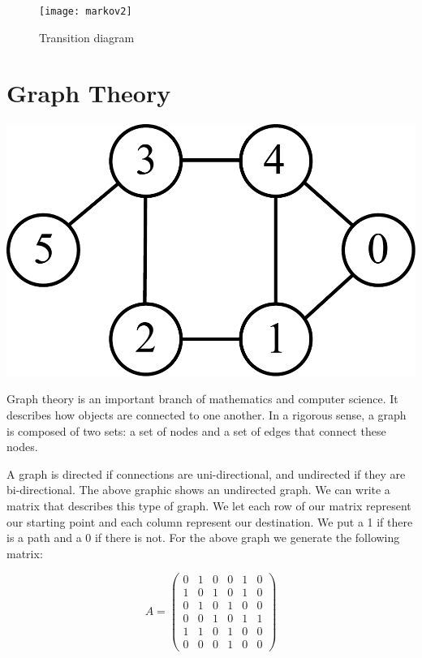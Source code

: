 \begin{figure}[h!]
\begin{center}
\texttt{[image: markov2]}
\end{center}
\caption{Transition diagram}
\label{markov2}
\end{figure}

\newpage

\section*{Graph Theory}
\begin{center}
\includegraphics[scale = .8]{graphExample}
\end{center}

Graph theory is an important branch of mathematics and computer science.
It describes how objects are connected to one another.
In a rigorous sense, a graph is composed of two sets: a set of nodes and a set of edges that connect these nodes. 

A graph is directed if connections are uni-directional, and undirected if they are bi-directional.
The above graphic shows an undirected graph.
We can write a matrix that describes this type of graph.
We let each row of our matrix represent our starting point and each column represent our destination.
We put a 1 if there is a path and a 0 if there is not.
For the above graph we generate the following matrix:

\[
A = \begin{pmatrix}
0 & 1 & 0 & 0 & 1 & 0\\
1 & 0 & 1 & 0 & 1 & 0\\
0 & 1 & 0 & 1 & 0 & 0\\
0 & 0 & 1 & 0 & 1 & 1\\
1 & 1 & 0 & 1 & 0 & 0\\
0 & 0 & 0 & 1 & 0 & 0
\end{pmatrix}
\]

